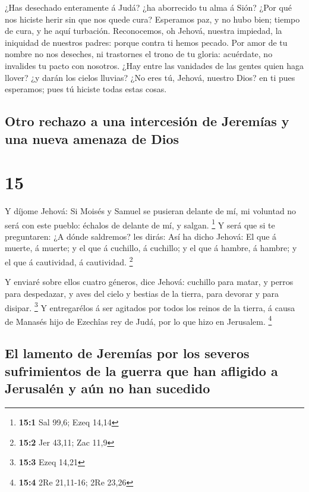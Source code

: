  ¿Has desechado enteramente á Judá? ¿ha aborrecido tu alma
á Sión? ¿Por qué nos hiciste herir sin que nos quede cura? Esperamos
paz, y no hubo bien; tiempo de cura, y he aquí turbación. 
Reconocemos, oh Jehová, nuestra impiedad, la iniquidad de nuestros
padres: porque contra ti hemos pecado.  Por amor de tu
nombre no nos deseches, ni trastornes el trono de tu gloria: acuérdate,
no invalides tu pacto con nosotros.  ¿Hay entre las
vanidades de las gentes quien haga llover? ¿y darán los cielos lluvias?
¿No eres tú, Jehová, nuestro Dios? en ti pues esperamos; pues tú hiciste
todas estas cosas.

\hypertarget{otro-rechazo-a-una-intercesiuxf3n-de-jeremuxedas-y-una-nueva-amenaza-de-dios}{%
\subsection{Otro rechazo a una intercesión de Jeremías y una nueva
amenaza de
Dios}\label{otro-rechazo-a-una-intercesiuxf3n-de-jeremuxedas-y-una-nueva-amenaza-de-dios}}

\hypertarget{section-14}{%
\section{15}\label{section-14}}

 Y díjome Jehová: Si Moisés y Samuel se pusieran delante de
mí, mi voluntad no será con este pueblo: échalos de delante de mí, y
salgan. \footnote{\textbf{15:1} Sal 99,6; Ezeq 14,14}  Y
será que si te preguntaren: ¿A dónde saldremos? les dirás: Así ha dicho
Jehová: El que á muerte, á muerte; y el que á cuchillo, á cuchillo; y el
que á hambre, á hambre; y el que á cautividad, á cautividad. \footnote{\textbf{15:2}
  Jer 43,11; Zac 11,9}

 Y enviaré sobre ellos cuatro géneros, dice Jehová: cuchillo
para matar, y perros para despedazar, y aves del cielo y bestias de la
tierra, para devorar y para disipar. \footnote{\textbf{15:3} Ezeq 14,21}
 Y entregarélos á ser agitados por todos los reinos de la
tierra, á causa de Manasés hijo de Ezechîas rey de Judá, por lo que hizo
en Jerusalem. \footnote{\textbf{15:4} 2Re 21,11-16; 2Re 23,26}

\hypertarget{el-lamento-de-jeremuxedas-por-los-severos-sufrimientos-de-la-guerra-que-han-afligido-a-jerusaluxe9n-y-auxfan-no-han-sucedido}{%
\subsection{El lamento de Jeremías por los severos sufrimientos de la
guerra que han afligido a Jerusalén y aún no han
sucedido}\label{el-lamento-de-jeremuxedas-por-los-severos-sufrimientos-de-la-guerra-que-han-afligido-a-jerusaluxe9n-y-auxfan-no-han-sucedido}}

